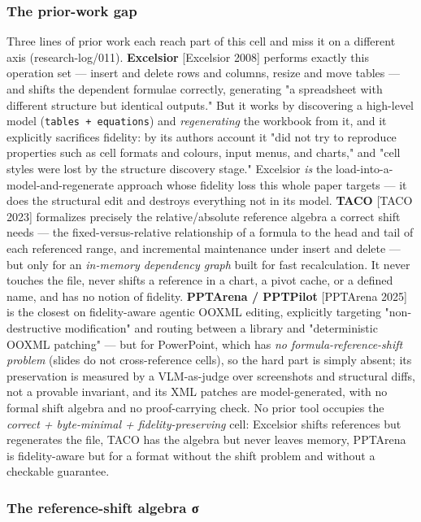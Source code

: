 \documentclass[
]{article}
\begin{document}
\subsubsection{The prior-work gap}\label{the-prior-work-gap}

Three lines of prior work each reach part of this cell and miss it on a
different axis (research-log/011). \textbf{Excelsior} {[}Excelsior
2008{]} performs exactly this operation set --- insert and delete rows
and columns, resize and move tables --- and shifts the dependent
formulae correctly, generating "a spreadsheet with different structure
but identical outputs." But it works by discovering a high-level model
(\texttt{tables\ +\ equations}) and \emph{regenerating} the workbook
from it, and it explicitly sacrifices fidelity: by its
authors\textquotesingle{} account it "did not try to reproduce
properties such as cell formats and colours, input menus, and charts,"
and "cell styles were lost by the structure discovery stage." Excelsior
\emph{is} the load-into-a-model-and-regenerate approach whose fidelity
loss this whole paper targets --- it does the structural edit and
destroys everything not in its model. \textbf{TACO} {[}TACO 2023{]}
formalizes precisely the relative/absolute reference algebra a correct
shift needs --- the fixed-versus-relative relationship of a formula to
the head and tail of each referenced range, and incremental maintenance
under insert and delete --- but only for an \emph{in-memory dependency
graph} built for fast recalculation. It never touches the file, never
shifts a reference in a chart, a pivot cache, or a defined name, and has
no notion of fidelity. \textbf{PPTArena / PPTPilot} {[}PPTArena 2025{]}
is the closest on fidelity-aware agentic OOXML editing, explicitly
targeting "non-destructive modification" and routing between a library
and "deterministic OOXML patching" --- but for PowerPoint, which has
\emph{no formula-reference-shift problem} (slides do not cross-reference
cells), so the hard part is simply absent; its preservation is measured
by a VLM-as-judge over screenshots and structural diffs, not a provable
invariant, and its XML patches are model-generated, with no formal shift
algebra and no proof-carrying check. No prior tool occupies the
\emph{correct + byte-minimal + fidelity-preserving} cell: Excelsior
shifts references but regenerates the file, TACO has the algebra but
never leaves memory, PPTArena is fidelity-aware but for a format without
the shift problem and without a checkable guarantee.

\subsubsection{The reference-shift algebra
σ}\label{the-reference-shift-algebra-ux3c3}
\end{document}
